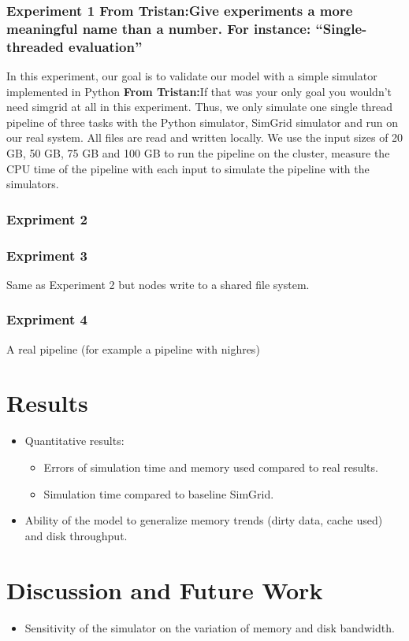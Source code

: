 \documentclass[conference]{IEEEtran}
\newcommand{\tristan}[1]{\color{orange}\textbf{From Tristan:}#1\color{black}}
\begin{document}
			\subsubsection{Experiment 1 \tristan{Give experiments a more meaningful name than a number. For instance: ``Single-threaded evaluation''}}

				In this experiment, our goal is to validate our model with
				a simple simulator implemented in Python \tristan{If that was your only goal you wouldn't need simgrid at all in this experiment}. Thus, we only
				simulate one single thread pipeline of three tasks with the
				Python simulator, SimGrid simulator and run on our real
				system. All files are read and written locally. We use the
				input sizes of 20 GB, 50 GB, 75 GB and 100 GB to run the
				pipeline on the cluster, measure the CPU time of the
				pipeline with each input to simulate the pipeline with the
				simulators.

			\subsubsection{Expriment 2}

				

			\subsubsection{Expriment 3}
				Same as Experiment 2 but nodes write to a shared file system.
			\subsubsection{Expriment 4}
				A real pipeline (for example a pipeline with nighres)

	\section{Results}
	
		\begin{itemize}

			\item Quantitative results: 
				\begin{itemize}
					\item Errors of simulation time and memory used compared to real results.
					\item Simulation time compared to baseline SimGrid.
				\end{itemize} 

			\item Ability of the model to generalize memory trends (dirty data, cache used) and disk throughput.

		\end{itemize}

	\section{Discussion and Future Work}
		\begin{itemize}
			\item Sensitivity of the simulator on the variation of memory and disk bandwidth. 
		\end{itemize}


\end{document}
